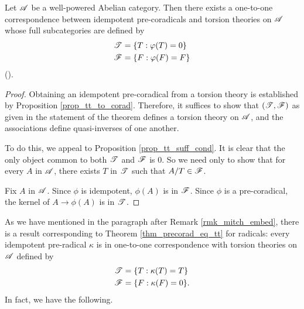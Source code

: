 \begin{thm}\label{thm_precorad_eq_tt}
Let $\mathscr{A}$ be a well-powered Abelian category. Then there exists
a one-to-one correspondence between idempotent pre-coradicals and
torsion theories on $\mathscr{A}$ whose full subcategories are defined 
by
\begin{align*}
\mathscr{T} &= \{ T : \varphi(T) = 0 \} \\
\mathscr{F} &= \{ F : \varphi(F) = F \}
\end{align*}
(\CF \cite[I2.9]{BJV}).
\end{thm}
\begin{proof}
Obtaining an idempotent pre-coradical from a torsion theory is
established by Proposition \ref{prop_tt_to_corad}. Therefore, it suffices
to show that $(\mathscr{T}, \mathscr{F})$ as given in the statement of the
theorem defines a torsion theory on $\mathscr{A}$, and the associations
define quasi-inverses of one another.

To do this, we appeal to Proposition \ref{prop_tt_suff_cond}. It is 
clear that the only object common to both $\mathscr{T}$
and $\mathscr{F}$ is $0$. So we need only to show that for every $A$ 
in $\mathscr{A}$, there exists $T$ in $\mathscr{T}$ such that $A/T \in 
\mathscr{F}$.

Fix $A$ in $\mathscr{A}$. Since $\phi$ is idempotent, $\phi(A)$ is 
in $\mathscr{F}$. Since $\phi$ is a pre-coradical, the kernel of $A
\to \phi(A)$ is in $\mathscr{T}$.
\end{proof}

As we have mentioned in the paragraph after Remark 
\ref{rmk_mitch_embed}, there is a result corresponding to Theorem 
\ref{thm_precorad_eq_tt} for radicals: every idempotent 
pre-radical $\kappa$ is in one-to-one correspondence with torsion 
theories on $\mathscr{A}$ defined by 
\begin{align*}
\mathscr{T} &= \{ T : \kappa(T) = T \} \\
\mathscr{F} &= \{ F : \kappa(F) = 0 \}.
\end{align*}
In fact, we have the following.

